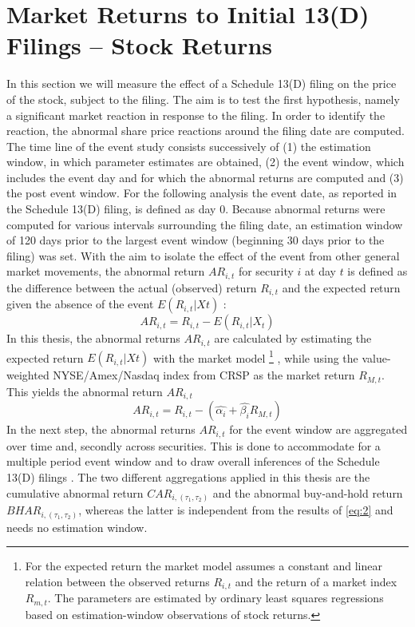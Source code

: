 \documentclass[12pt]{article}
\begin{document}
\section{Market Returns to Initial 13(D) Filings -- Stock Returns}
In this section we will measure the effect of a Schedule 13(D) filing on the price of the stock, subject to the filing. The aim is to test the first hypothesis, namely a significant market reaction in response to the filing. In order to identify the reaction, the abnormal share price reactions around the filing date are computed.\\
The time line of the event study consists successively of (1) the estimation window, in which parameter estimates are obtained, (2) the event window, which includes the event day and for which the abnormal returns are computed and (3) the post event window. For the following analysis the event date, as reported in the Schedule 13(D) filing, is defined as day 0. Because abnormal returns were computed for various intervals surrounding the filing date, an estimation window of 120 days prior to the largest event window (beginning 30 days prior to the filing) was set.  
With the aim to isolate the effect of the event from other general market movements, the abnormal return $AR_{i,t}$ for security $i$ at day $t$ is defined as the difference between the actual (observed) return $R_{i,t}$ and the expected return given the absence of the event $E(R_{i,t}|X{t})$ :
	\begin{equation}\label{eq:1}
		AR_{i,t}=R_{i,t}-E(R_{i,t}|X_{t})
	\end{equation}
In this thesis, the abnormal returns $AR_{i,t}$ are calculated by estimating the expected return $E(R_{i,t}|X{t})$ with the market model 
	\footnote{For the expected return the market model assumes a constant and linear relation between the observed returns $R_{i,t}$ and the return of a market index $R_{m,t}$. The parameters are estimated by ordinary least squares regressions based on estimation-window observations of stock returns.} 
, while using the value-weighted NYSE/Amex/Nasdaq index from CRSP as the market return $R_{M,t}$.
This yields the abnormal return $AR_{i,t}$
\begin{equation}\label{eq:2}
	AR_{i,t}=R_{i,t}-(\hat{\alpha_{i}}+\hat{\beta_{i}}R_{M,t})
\end{equation}
In the next step, the abnormal returns $AR_{i,t}$ for the event window are aggregated over time and, secondly across securities. This is done to accommodate for a multiple period event window and to draw overall inferences of the Schedule 13(D) filings \citep{MacKinlay1997}.
The two different aggregations applied in this thesis are the cumulative abnormal return $CAR_{i,(\tau_1,\tau_2)}$ and the abnormal buy-and-hold return $BHAR_{i,(\tau_1,\tau_2)}$, whereas the latter is independent from the results of \eqref{eq:2} and needs no estimation window.
\end{document}
